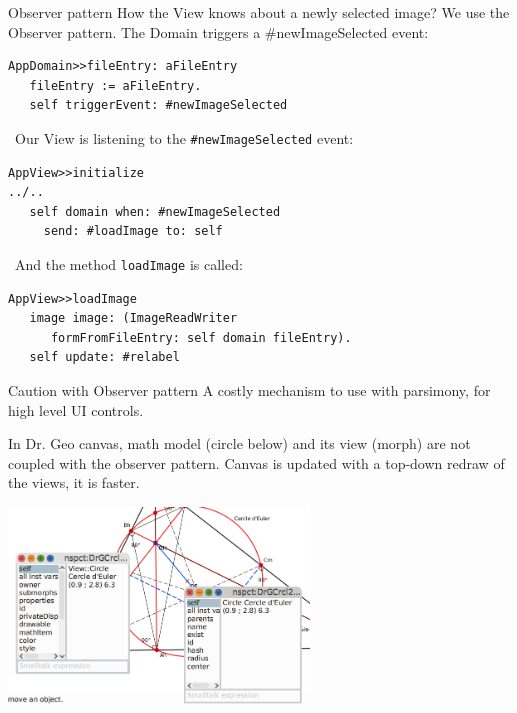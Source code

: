 \documentclass{beamer}
\newcommand{\tip}{\boldmath{\textcolor{red}{$\Rightarrow$}}}
\begin{document}
\begin{frame}[fragile]{Observer pattern}
  How the View knows about a newly selected image? We use the Observer
  pattern. The Domain triggers a \#newImageSelected event:

  \fontsize{10pt}{8pt}\selectfont
  \begin{lstlisting}[language=Smalltalk]
AppDomain>>fileEntry: aFileEntry
   fileEntry := aFileEntry.
   self triggerEvent: #newImageSelected
 \end{lstlisting}
 
 \tip\ Our View is listening to the \texttt{\#newImageSelected} event:
 \begin{lstlisting}[language=Smalltalk]
AppView>>initialize
../..
   self domain when: #newImageSelected
     send: #loadImage to: self
 \end{lstlisting}

  \tip\ And the method \texttt{loadImage} is called:
  \begin{lstlisting}[language=Smalltalk]
AppView>>loadImage
   image image: (ImageReadWriter
      formFromFileEntry: self domain fileEntry).
   self update: #relabel
  \end{lstlisting}
\end{frame}
%
\begin{frame}{Caution with Observer pattern}
  A costly mechanism to use with parsimony, for high level UI
  controls.

  \vspace*{10pt}

  In Dr. Geo canvas, math model (circle below) and its view (morph)
  are not coupled with the observer pattern. Canvas is updated with a
  top-down redraw of the views, it is faster.

  \begin{center}
    \includegraphics[width=0.6\textwidth]{DrGeoViewModel.png}
  \end{center}
  
\end{frame}
\end{document}
